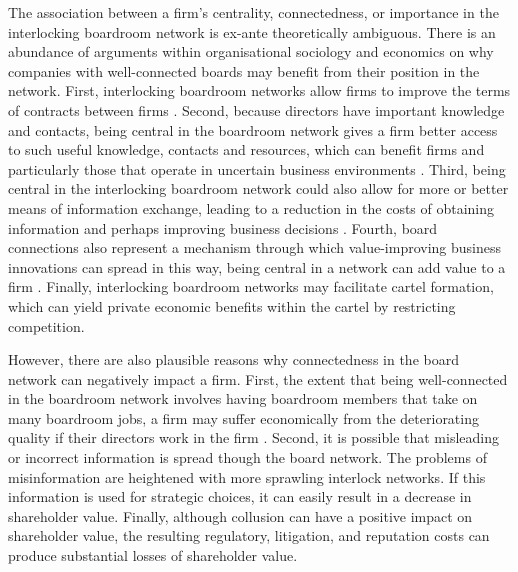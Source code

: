 The association between a firm's centrality, connectedness, or importance in the interlocking boardroom network is ex-ante theoretically ambiguous. There is an abundance of arguments within organisational sociology and economics on why companies with well-connected boards may benefit from their position in the network. First, interlocking boardroom networks allow firms to improve the terms of contracts between firms \citep{SchoormanBazermanAtkin1981}. Second, because directors have important knowledge and contacts, being central in the boardroom network gives a firm better access to such useful knowledge, contacts and resources, which can benefit firms and particularly those that operate in uncertain business environments \citep{Mol2001, NicholsonAlexanderKiel2004}. Third, being central in the interlocking boardroom network could also allow for more or better means of information exchange, leading to a reduction in the costs of obtaining information and perhaps improving business decisions \citep{Mizruchi1990}. Fourth, board connections also represent a mechanism through which value-improving business innovations can spread in this way, being central in a network can add value to a firm \citep{HaunschildBeckman1998}. Finally, interlocking boardroom networks may facilitate cartel formation, which can yield private economic benefits within the cartel by restricting competition.

However, there are also plausible reasons why connectedness in the board network can negatively impact a firm. First, the extent that being well-connected in the boardroom network involves having boardroom members that take on many boardroom jobs, a firm may suffer economically from the deteriorating quality if their directors work in the firm \citep{FichShivdasani2006, FichWhite2005}. Second, it is possible that misleading or incorrect information is spread though the board network. The problems of misinformation are heightened with more sprawling interlock networks. If this information is used for strategic choices, it can easily result in a decrease in shareholder value. Finally, although collusion can have a positive impact on shareholder value, the resulting regulatory, litigation, and reputation costs can produce substantial losses of shareholder value.

